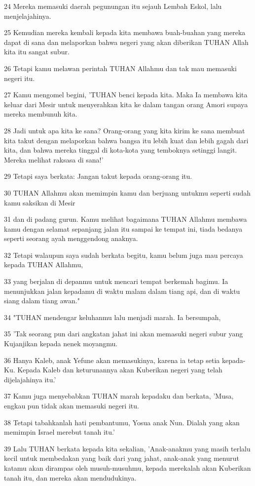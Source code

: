 \par 24 Mereka memasuki daerah pegunungan itu sejauh Lembah Eskol, lalu menjelajahinya.
\par 25 Kemudian mereka kembali kepada kita membawa buah-buahan yang mereka dapat di sana dan melaporkan bahwa negeri yang akan diberikan TUHAN Allah kita itu sangat subur.
\par 26 Tetapi kamu melawan perintah TUHAN Allahmu dan tak mau memasuki negeri itu.
\par 27 Kamu mengomel begini, 'TUHAN benci kepada kita. Maka Ia membawa kita keluar dari Mesir untuk menyerahkan kita ke dalam tangan orang Amori supaya mereka membunuh kita.
\par 28 Jadi untuk apa kita ke sana? Orang-orang yang kita kirim ke sana membuat kita takut dengan melaporkan bahwa bangsa itu lebih kuat dan lebih gagah dari kita, dan bahwa mereka tinggal di kota-kota yang temboknya setinggi langit. Mereka melihat raksasa di sana!'
\par 29 Tetapi saya berkata: Jangan takut kepada orang-orang itu.
\par 30 TUHAN Allahmu akan memimpin kamu dan berjuang untukmu seperti sudah kamu saksikan di Mesir
\par 31 dan di padang gurun. Kamu melihat bagaimana TUHAN Allahmu membawa kamu dengan selamat sepanjang jalan itu sampai ke tempat ini, tiada bedanya seperti seorang ayah menggendong anaknya.
\par 32 Tetapi walaupun saya sudah berkata begitu, kamu belum juga mau percaya kepada TUHAN Allahmu,
\par 33 yang berjalan di depanmu untuk mencari tempat berkemah bagimu. Ia menunjukkan jalan kepadamu di waktu malam dalam tiang api, dan di waktu siang dalam tiang awan."
\par 34 "TUHAN mendengar keluhanmu lalu menjadi marah. Ia bersumpah,
\par 35 'Tak seorang pun dari angkatan jahat ini akan memasuki negeri subur yang Kujanjikan kepada nenek moyangmu.
\par 36 Hanya Kaleb, anak Yefune akan memasukinya, karena ia tetap setia kepada-Ku. Kepada Kaleb dan keturunannya akan Kuberikan negeri yang telah dijelajahinya itu.'
\par 37 Kamu juga menyebabkan TUHAN marah kepadaku dan berkata, 'Musa, engkau pun tidak akan memasuki negeri itu.
\par 38 Tetapi tabahkanlah hati pembantumu, Yosua anak Nun. Dialah yang akan memimpin Israel merebut tanah itu.'
\par 39 Lalu TUHAN berkata kepada kita sekalian, 'Anak-anakmu yang masih terlalu kecil untuk membedakan yang baik dari yang jahat, anak-anak yang menurut katamu akan dirampas oleh musuh-musuhmu, kepada merekalah akan Kuberikan tanah itu, dan mereka akan mendudukinya.
